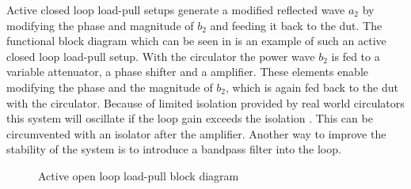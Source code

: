 \documentclass[12pt,a4paper,parskip=full,abstract=true,BCOR=10mm,twoside,open=right]{scrreprt}
\begin{document}
Active closed loop load-pull setups generate a modified reflected wave $a_2$ by
modifying the phase and magnitude of $b_2$ and feeding it back to the \gls{dut}.
The functional block diagram which can be seen in 
is an example of such an active closed loop load-pull setup. With the circulator
the power wave $b_2$ is fed to a variable attenuator, a phase shifter and a
amplifier. These elements enable modifying the phase and the magnitude of $b_2$,
which is again fed back to the \gls{dut} with the circulator. Because of limited
isolation provided by real world circulators this system will oscillate if the loop gain
exceeds the isolation \cite{ghannouchi_load-pull_2013}. This can be circumvented with
an isolator after the amplifier. Another way to improve the stability of the system
is to introduce a bandpass filter into the loop.

\begin{figure}[htb]
    \centering
    \caption{Active open loop load-pull block diagram}
    \label{fig:active_open_loop}
\end{figure}
\end{document}

